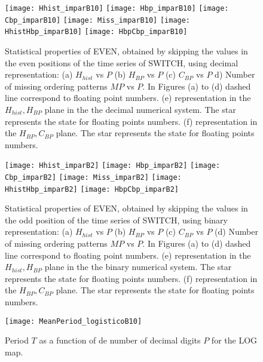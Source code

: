 \begin{figure}
\texttt{[image: Hhist\_imparB10]}
\texttt{[image: Hbp\_imparB10]}
\texttt{[image: Cbp\_imparB10]}
\texttt{[image: Miss\_imparB10]}
\texttt{[image: HhistHbp\_imparB10]}
\texttt{[image: HbpCbp\_imparB10]}
\caption{Statistical properties of EVEN, obtained by skipping the values in the even positions of the time series of  SWITCH,  using decimal representation: (a) $H_{hist}$ vs $P$ (b) $H_{BP}$ vs $P$ (c) $C_{BP}$ vs $P$ d) Number of missing ordering patterns $MP$ vs $P$. In Figures (a) to (d) dashed line correspond to floating point numbers. (e) representation in the $H_{hist},H_{BP}$ plane in the the decimal numerical system.  The star represents the state for floating points numbers. (f) representation in the $H_{BP},C_{BP}$ plane.  The star represents the state for floating points numbers. } \label{fig:seqimpardec}
\end{figure}

\begin{figure}
\texttt{[image: Hhist\_imparB2]}
\texttt{[image: Hbp\_imparB2]}
\texttt{[image: Cbp\_imparB2]}
\texttt{[image: Miss\_imparB2]}
\texttt{[image: HhistHbp\_imparB2]}
\texttt{[image: HbpCbp\_imparB2]}
\caption{Statistical properties of EVEN, obtained by skipping the values in the odd position of the time series of  SWITCH,  using binary representation: (a) $H_{hist}$ vs $P$ (b) $H_{BP}$ vs $P$ (c) $C_{BP}$ vs $P$ (d) Number of missing ordering patterns $MP$ vs $P$. In Figures (a) to (d) dashed line correspond to floating point numbers. (e) representation in the $H_{hist},H_{BP}$ plane in the the binary numerical system.  The star represents the state for floating points numbers. (f) representation in the $H_{BP},C_{BP}$ plane.  The star represents the state for floating points numbers.  } \label{fig:seqimparbin}
\end{figure}


\center
\begin{figure}
	\texttt{[image: MeanPeriod\_logisticoB10]}
	\caption{Period $T$ as a function of de number of decimal digits $P$ for the LOG map.} \label{fig:perio}
\end{figure}